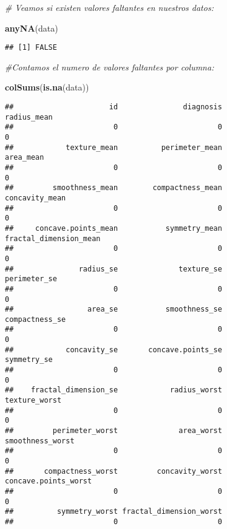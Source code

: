 \documentclass[
]{article}
\newenvironment{Shaded}{\begin{snugshade}}{\end{snugshade}}
\newcommand{\CommentTok}[1]{\textcolor[rgb]{0.56,0.35,0.01}{\textit{#1}}}
\newcommand{\FunctionTok}[1]{\textcolor[rgb]{0.13,0.29,0.53}{\textbf{#1}}}
\newcommand{\NormalTok}[1]{#1}
\begin{document}
\begin{Shaded}
\begin{Highlighting}[]
\CommentTok{\# Veamos si existen valores faltantes en nuestros datos:}

\FunctionTok{anyNA}\NormalTok{(data)}
\end{Highlighting}
\end{Shaded}

\begin{verbatim}
## [1] FALSE
\end{verbatim}

\begin{Shaded}
\begin{Highlighting}[]
\CommentTok{\#Contamos el numero de valores faltantes por columna:}

\FunctionTok{colSums}\NormalTok{(}\FunctionTok{is.na}\NormalTok{(data))}
\end{Highlighting}
\end{Shaded}

\begin{verbatim}
##                      id               diagnosis             radius_mean 
##                       0                       0                       0 
##            texture_mean          perimeter_mean               area_mean 
##                       0                       0                       0 
##         smoothness_mean        compactness_mean          concavity_mean 
##                       0                       0                       0 
##     concave.points_mean           symmetry_mean  fractal_dimension_mean 
##                       0                       0                       0 
##               radius_se              texture_se            perimeter_se 
##                       0                       0                       0 
##                 area_se           smoothness_se          compactness_se 
##                       0                       0                       0 
##            concavity_se       concave.points_se             symmetry_se 
##                       0                       0                       0 
##    fractal_dimension_se            radius_worst           texture_worst 
##                       0                       0                       0 
##         perimeter_worst              area_worst        smoothness_worst 
##                       0                       0                       0 
##       compactness_worst         concavity_worst    concave.points_worst 
##                       0                       0                       0 
##          symmetry_worst fractal_dimension_worst 
##                       0                       0
\end{verbatim}
\end{document}
